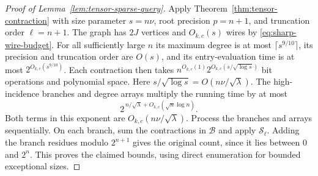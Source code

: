 \begin{proof}[Proof of Lemma~\ref{lem:tensor-sparse-query}]
Apply Theorem~\ref{thm:tensor-contraction} with size parameter
$s=n\nu$, root precision $p=n+1$, and truncation order $\ell=n+1$.
The graph has $2J$ vertices and $O_{k,c}(s)$ wires by
\eqref{eq:sharp-wire-budget}. For all sufficiently large $n$ its
maximum degree is at most $\lceil s^{9/10}\rceil$, its precision
and truncation order are $O(s)$, and its entry-evaluation time is
at most $2^{O_{k,c}(s^{9/10})}$. Each contraction then takes
$n^{O_{k,c}(1)}2^{O_{k,c}(s/\sqrt{\log s})}$ bit operations and
polynomial space. Here $s/\sqrt{\log s}=O(n\nu/\sqrt\lambda)$.
The high-incidence branches and degree arrays multiply the
running time by at most
\[
 2^{\,n/\sqrt{\lambda}+O_{k,c}(\sqrt n\log n)}.
\]
Both terms in this exponent are $O_{k,c}(n\nu/\sqrt{\lambda})$.
Process the branches and arrays sequentially. On each branch,
sum the contractions in $\mathcal B$ and apply $\mathcal S_\ell$.
Adding the branch residues modulo $2^{n+1}$ gives the original
count, since it lies between $0$ and $2^n$. This proves the
claimed bounds, using direct enumeration for bounded exceptional
sizes.
\end{proof}

